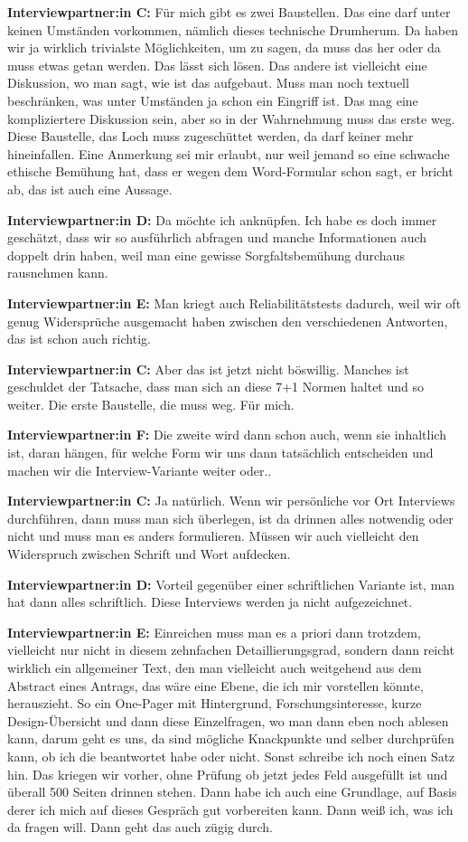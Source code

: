 \documentclass[a4paper,12pt,twoside]{scrreprt}
\begin{document}
\textbf{Interviewpartner:in C:} Für mich gibt es zwei Baustellen. Das eine darf unter keinen Umständen vorkommen, nämlich dieses technische Drumherum. Da haben wir ja wirklich trivialste Möglichkeiten, um zu sagen, da muss das her oder da muss etwas getan werden. Das lässt sich lösen. Das andere ist vielleicht eine Diskussion, wo man sagt, wie ist das aufgebaut. Muss man noch textuell beschränken, was unter Umständen ja schon ein Eingriff ist. Das mag eine kompliziertere Diskussion sein, aber so in der Wahrnehmung muss das erste weg. Diese Baustelle, das Loch muss zugeschüttet werden, da darf keiner mehr hineinfallen. Eine Anmerkung sei mir erlaubt, nur weil jemand so eine schwache ethische Bemühung hat, dass er wegen dem Word-Formular schon sagt, er bricht ab, das ist auch eine Aussage.

\textbf{Interviewpartner:in D:} Da möchte ich anknüpfen. Ich habe es doch immer geschätzt, dass wir so ausführlich abfragen und manche Informationen auch doppelt drin haben, weil man eine gewisse Sorgfaltsbemühung durchaus rausnehmen kann.

\textbf{Interviewpartner:in E:} Man kriegt auch Reliabilitätstests dadurch, weil wir oft genug Widersprüche ausgemacht haben zwischen den verschiedenen Antworten, das ist schon auch richtig.

\textbf{Interviewpartner:in C:} Aber das ist jetzt nicht böswillig. Manches ist geschuldet der Tatsache, dass man sich an diese 7+1 Normen haltet und so weiter. Die erste Baustelle, die muss weg. Für mich.

\textbf{Interviewpartner:in F:} Die zweite wird dann schon auch, wenn sie inhaltlich ist, daran hängen, für welche Form wir uns dann tatsächlich entscheiden und machen wir die Interview-Variante weiter oder..

\textbf{Interviewpartner:in C:} Ja natürlich. Wenn wir persönliche vor Ort Interviews durchführen, dann muss man sich überlegen, ist da drinnen alles notwendig oder nicht und muss man es anders formulieren. Müssen wir auch vielleicht den Widerspruch zwischen Schrift und Wort aufdecken.

\textbf{Interviewpartner:in D:} Vorteil gegenüber einer schriftlichen Variante ist, man hat dann alles schriftlich. Diese Interviews werden ja nicht aufgezeichnet.

\textbf{Interviewpartner:in E:} Einreichen muss man es a priori dann trotzdem, vielleicht nur nicht in diesem zehnfachen Detaillierungsgrad, sondern dann reicht wirklich ein allgemeiner Text, den man vielleicht auch weitgehend aus dem Abstract eines Antrags, das wäre eine Ebene, die ich mir vorstellen könnte, herauszieht. So ein One-Pager mit Hintergrund, Forschungsinteresse, kurze Design-Übersicht und dann diese Einzelfragen, wo man dann eben noch ablesen kann, darum geht es uns, da sind mögliche Knackpunkte und selber durchprüfen kann, ob ich die beantwortet habe oder nicht. Sonst schreibe ich noch einen Satz hin. Das kriegen wir vorher, ohne Prüfung ob jetzt jedes Feld ausgefüllt ist und überall 500 Seiten drinnen stehen. Dann habe ich auch eine Grundlage, auf Basis derer ich mich auf dieses Gespräch gut vorbereiten kann. Dann weiß ich, was ich da fragen will. Dann geht das auch zügig durch.
\end{document}
